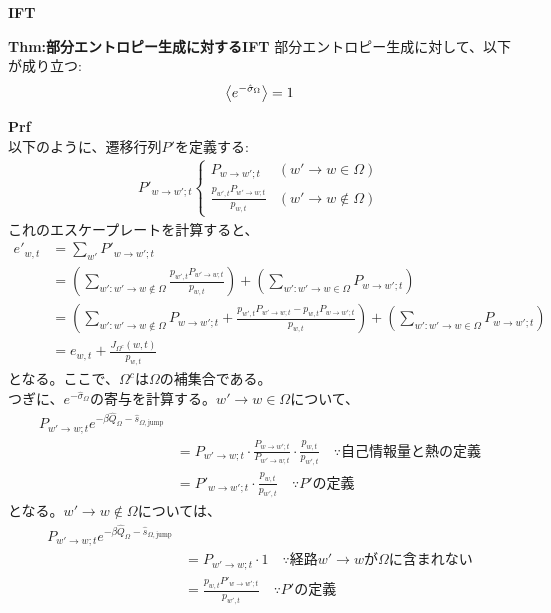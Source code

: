 \documentclass[a4paper,11pt]{jsarticle}
\numberwithin{equation}{section}
\begin{document}
\textbf{IFT}\\
\begin{itembox}[l]{\textbf{Thm:部分エントロピー生成に対するIFT}}
    部分エントロピー生成に対して、以下が成り立つ:
    \begin{align}
        \ev{e^{-\hat{\sigma}_\Omega}} = 1
    \end{align}
\end{itembox}
\textbf{Prf}\\
以下のように、遷移行列$P'$を定義する:
\begin{align}
    P'_{w \to w'; t} 
    \begin{cases}
        P_{w \to w'; t} & (w' \to w \in \Omega) \\
        \frac{p_{w',t}P_{w' \to w; t}}{p_{w,t}} & (w' \to w \notin \Omega)
    \end{cases}
\end{align}
これのエスケープレートを計算すると、
\begin{align}
    e'_{w,t} &= \sum_{w'} P'_{w \to w'; t} \\
    &= \left( \sum_{w' : w' \to w \notin \Omega} \frac{p_{w',t}P_{w' \to w; t}}{p_{w,t}}\right) + \left(\sum_{w' : w' \to w \in \Omega} P_{w \to w'; t} \right) \\
    &= \left( \sum_{w' : w' \to w \notin \Omega} P_{w \to w'; t} +\frac{p_{w',t}P_{w' \to w; t}-p_{w,t}P_{w \to w'; t}}{p_{w,t}}\right) + \left(\sum_{w' : w' \to w \in \Omega} P_{w \to w'; t} \right) \\
    &= e_{w,t} + \frac{J_{\Omega^c}(w,t)}{p_{w,t}} 
\end{align}
となる。ここで、$\Omega^c$は$\Omega$の補集合である。\\
つぎに、$e^{-\hat{\sigma}_\Omega}$の寄与を計算する。$w' \to w \in \Omega$について、
\begin{align}
    P_{w' \to w; t} e^{-\beta \hat{Q}_{\Omega}-\hat{s}_{\Omega, \text{jump}}} \\
    &= P_{w' \to w; t} \cdot \frac{P_{w \to w'; t}}{P_{w' \to w; t}} \cdot \frac{p_{w,t}}{p_{w',t}} \quad \because \text{自己情報量と熱の定義} \\
    &= P'_{w \to w'; t} \cdot \frac{p_{w,t}}{p_{w',t}} \quad \because \text{$P'$の定義} 
\end{align}
となる。$w' \to w \notin \Omega$については、
\begin{align}
    P_{w' \to w; t} e^{-\beta \hat{Q}_{\Omega}-\hat{s}_{\Omega, \text{jump}}} \\
    &= P_{w' \to w; t} \cdot 1\quad \because \text{経路$w' \to w$が$\Omega$に含まれない} \\
    &= \frac{p_{w,t}P'_{w \to w'; t}}{p_{w',t}} \quad \because \text{$P'$の定義}
\end{align}
\end{document}
